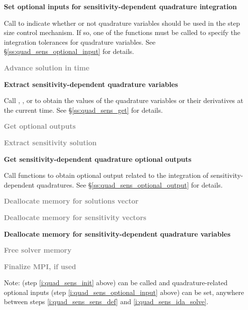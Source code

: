 \begin{Steps}
\item\label{i:quad_sens_optional_input}
  {\bf Set optional inputs for sensitivity-dependent quadrature integration}

  Call  to indicate whether or not quadrature variables
  should be used in the step size control mechanism. If so, one of the 
   functions  must be called to specify the integration 
  tolerances for quadrature variables.
  See \S\ref{ss:quad_sens_optional_input} for details.

\item\label{i:quad_sens_ida_solve}
  \textcolor{gray}{\bf Advance solution in time}

\item
  {\bf Extract sensitivity-dependent quadrature variables}

  Call , ,  or 
   to obtain the values of the quadrature variables or their 
  derivatives at the current time. See \S\ref{ss:quad_sens_get} for details.

\item
  \textcolor{gray}{\bf Get optional outputs}

\item
  \textcolor{gray}{\bf Extract sensitivity solution}

\item
  {\bf Get sensitivity-dependent quadrature optional outputs}

  Call  functions to obtain optional output related to
  the integration of sensitivity-dependent quadratures.
  See \S\ref{ss:quad_sens_optional_output} for details.

\item
  \textcolor{gray}{\bf Deallocate memory for solutions vector}

\item 
  \textcolor{gray}{\bf Deallocate memory for sensitivity vectors}

\item
  {\bf Deallocate memory for sensitivity-dependent quadrature variables}
  
\item
  \textcolor{gray}{\bf Free solver memory}

\item 
  \textcolor{gray}{\bf Finalize MPI, if used}
  
\end{Steps}
Note:  (step \ref{i:quad_sens_init} above) can be called and
quadrature-related optional inputs (step \ref{i:quad_sens_optional_input} above)
can be set, anywhere between steps \ref{i:quad_sens_sens_def} and
\ref{i:quad_sens_ida_solve}.


